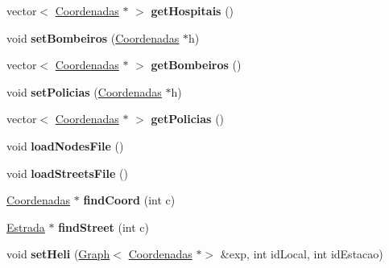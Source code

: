 \begin{DoxyCompactItemize}
\item 
\hypertarget{class_dados_a3f30e7d6147a6e057efeda601428c9b3}{}\label{class_dados_a3f30e7d6147a6e057efeda601428c9b3} 
vector$<$ \hyperlink{class_coordenadas}{Coordenadas} $\ast$ $>$ {\bfseries get\+Hospitais} ()
\item 
\hypertarget{class_dados_af7d722284adc4c46eb3514b3062affcd}{}\label{class_dados_af7d722284adc4c46eb3514b3062affcd} 
void {\bfseries set\+Bombeiros} (\hyperlink{class_coordenadas}{Coordenadas} $\ast$h)
\item 
\hypertarget{class_dados_a3a10b89bd10631c3e071303d836244d1}{}\label{class_dados_a3a10b89bd10631c3e071303d836244d1} 
vector$<$ \hyperlink{class_coordenadas}{Coordenadas} $\ast$ $>$ {\bfseries get\+Bombeiros} ()
\item 
\hypertarget{class_dados_a6c16c2442eca9bca3a13f19a575241e9}{}\label{class_dados_a6c16c2442eca9bca3a13f19a575241e9} 
void {\bfseries set\+Policias} (\hyperlink{class_coordenadas}{Coordenadas} $\ast$h)
\item 
\hypertarget{class_dados_aa53c87820e9852e4114b5dff937eff9e}{}\label{class_dados_aa53c87820e9852e4114b5dff937eff9e} 
vector$<$ \hyperlink{class_coordenadas}{Coordenadas} $\ast$ $>$ {\bfseries get\+Policias} ()
\item 
\hypertarget{class_dados_ab50116175c27cdb7cfdac2d71ed38afb}{}\label{class_dados_ab50116175c27cdb7cfdac2d71ed38afb} 
void {\bfseries load\+Nodes\+File} ()
\item 
\hypertarget{class_dados_a495de231f8f3bfd7e4e65a4445e66456}{}\label{class_dados_a495de231f8f3bfd7e4e65a4445e66456} 
void {\bfseries load\+Streets\+File} ()
\item 
\hypertarget{class_dados_ad511b6084a2b9bd0413a30a252f6931b}{}\label{class_dados_ad511b6084a2b9bd0413a30a252f6931b} 
\hyperlink{class_coordenadas}{Coordenadas} $\ast$ {\bfseries find\+Coord} (int c)
\item 
\hypertarget{class_dados_a81ccb8b0ec829673731694f0d0475d8c}{}\label{class_dados_a81ccb8b0ec829673731694f0d0475d8c} 
\hyperlink{class_estrada}{Estrada} $\ast$ {\bfseries find\+Street} (int c)
\item 
\hypertarget{class_dados_a42e5f8a9860f00247f63131eec9e18b4}{}\label{class_dados_a42e5f8a9860f00247f63131eec9e18b4} 
void {\bfseries set\+Heli} (\hyperlink{class_graph}{Graph}$<$ \hyperlink{class_coordenadas}{Coordenadas} $\ast$$>$ \&exp, int id\+Local, int id\+Estacao)
\item 
\hypertarget{class_dados_a006607fb3a2f8b4226ed85360547d5dd}{}\label{class_dados_a006607fb3a2f8b4226ed85360547d5dd} 
$$
\end{DoxyCompactItemize}

